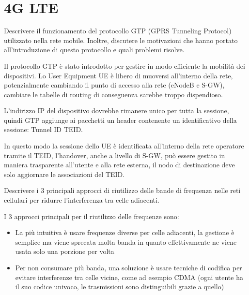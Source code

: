 \section{4G LTE}

\begin{questions}
    \question Descrivere il funzionamento del protocollo GTP (GPRS Tunneling Protocol) utilizzato nella rete mobile. Inoltre, discutere le motivazioni che hanno portato all'introduzione di questo protocollo e quali problemi risolve.
    
    \begin{solution}
        Il protocollo GTP è stato introdotto per gestire in modo efficiente la mobilità dei dispositivi. Lo User Equipment UE è libero di muoversi all'interno della rete, potenzialmente cambiando il punto di accesso alla rete (eNodeB e S-GW), cambiare le tabelle di routing di conseguenza sarebbe troppo dispendioso. 
        
        L'indirizzo IP del dispositivo dovrebbe rimanere unico per tutta la sessione, quindi GTP aggiunge ai pacchetti un header contenente un identificativo della sessione: Tunnel ID TEID. 
        
        In questo modo la sessione dello UE è identificata all'interno della rete operatore tramite il TEID, l'handover, anche a livello di S-GW, può essere gestito in maniera trasparente all'utente e alla rete esterna, il nodo di destinazione deve solo aggiornare le associazioni del TEID.
    \end{solution}
    
    \question Descrivere i 3 principali approcci di riutilizzo delle bande di frequenza nelle reti cellulari per ridurre l'interferenza tra celle adiacenti.
    
    \begin{solution}
        I 3 approcci principali per il riutilizzo delle frequenze sono: 
        \begin{itemize}
            \item La più intuitiva è usare frequenze diverse per celle adiacenti, la gestione è semplice ma viene sprecata molta banda in quanto effettivamente ne viene usata solo una porzione per volta
            
            \item Per non consumare più banda, una soluzione è usare tecniche di codifica per evitare interferenze tra celle vicine, come ad esempio CDMA (ogni utente ha il suo codice univoco, le trasmissioni sono distinguibili grazie a quello)
            

\end{itemize}
\end{solution}
\end{questions}
